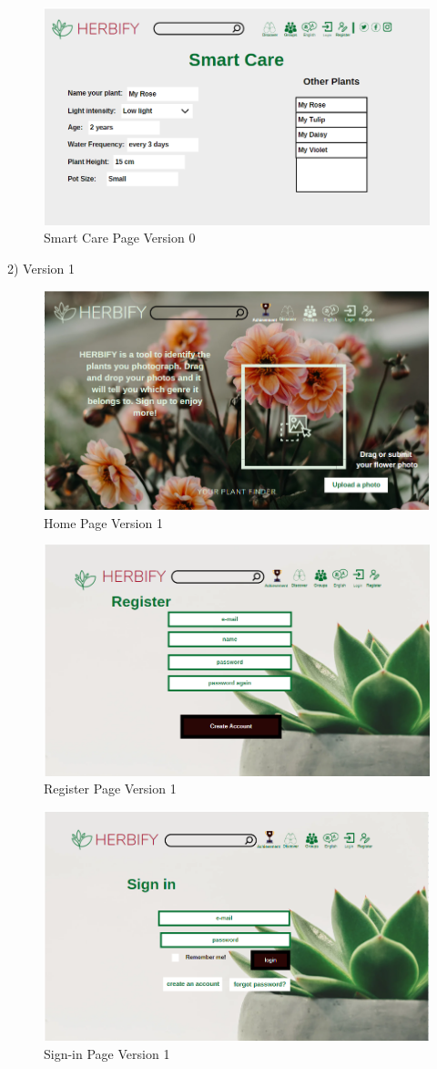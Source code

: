\documentclass[conference]{IEEEtran}
\begin{document}
\begin{figure}[H]
\centerline{\includegraphics[width=0.48 \textwidth]{images/smartcarev0.png}}
\caption{Smart Care Page Version 0}
\label{fig:graph1}
\end{figure}

2) Version 1


\begin{figure}[H]
\centerline{\includegraphics[width=0.48 \textwidth]{images/homev1.png}}
\caption{Home Page Version 1}
\label{fig:graph1}
\end{figure}


\begin{figure}[H]
\centerline{\includegraphics[width=0.48 \textwidth]{images/registerv1.png}}
\caption{Register Page Version 1}
\label{fig:graph1}
\end{figure}


\begin{figure}[H]
\centerline{\includegraphics[width=0.48 \textwidth]{images/signinv1.png}}
\caption{Sign-in Page Version 1}
\label{fig:graph1}
\end{figure}
\end{document}
